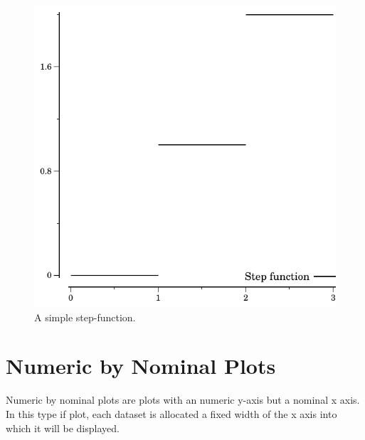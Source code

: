 \documentclass{article}
\begin{document}
\begin{figure}[t]
\begin{center}
\includegraphics{step_func}
\caption{\label{fig:step}A simple step-function.}
\end{center}
\end{figure}

\section{\label{sect:num-by-nom} Numeric by Nominal Plots}

Numeric by nominal plots are plots with an numeric y-axis but a
nominal x axis.  In this type if plot, each dataset is allocated a
fixed width of the x axis into which it will be displayed.
\end{document}

